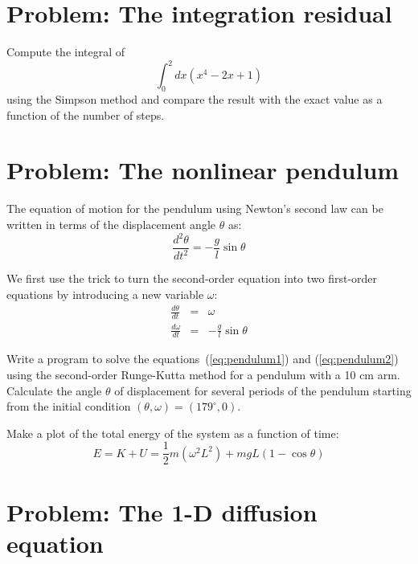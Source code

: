 \documentclass[10pt]{article}
\begin{document}
\section{Problem: The integration residual}

Compute the integral of 
%
\begin{equation}
\int_0^2 dx (x^4 - 2x + 1)
\end{equation}
%
using the Simpson method and compare the result with the exact value as a function of the number of steps.

\section{Problem: The nonlinear pendulum}

The equation of motion for the pendulum using Newton's second law can be written in terms of the displacement angle $\theta$ as:
%
\begin{equation}\label{eq:pendulum}
\frac{d^2\theta}{dt^2} = - \frac{g}{l} \sin \theta
\end{equation}

We first use the trick to turn the second-order equation into two first-order equations by introducing a new variable $\omega$:
%
\begin{eqnarray}
\frac{d\theta}{dt} & = & \omega \label{eq:pendulum1}\\ 
\frac{d\omega}{dt} & = & -\frac{g}{l} \sin \theta \label{eq:pendulum2}
\end{eqnarray}

\begin{question}
Write a program to solve the equations~(\ref{eq:pendulum1}) and (\ref{eq:pendulum2}) using the second-order Runge-Kutta method for a pendulum with a 10 cm arm.
Calculate the angle $\theta$ of displacement for several periods of the pendulum starting from the initial condition $(\theta, \omega) = (179^\circ, 0)$.
\end{question}

\begin{question}
Make a plot of the total energy of the system as a function of time:
%
\begin{equation}
E = K + U = \frac{1}{2} m (\omega^2 L^2) + m g L (1 - \cos \theta) 
\end{equation}
\end{question}

\section{Problem: The 1-D diffusion equation}
\end{document}
